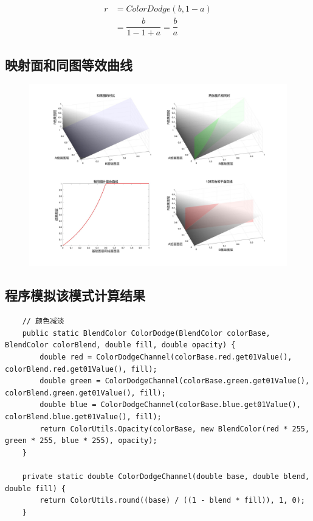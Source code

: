 \begin{equation}\begin{aligned}
	r&=ColorDodge(b,1-a)\\&= \dfrac{b}{1-1+a}=\dfrac{b}{a}
\end{aligned}\end{equation}

\subsection{ 映射面和同图等效曲线}
\begin{figure}[h!]
	\centering
	\includegraphics[width=\linewidth]{figure/颜色减淡.jpg}
	\caption{}
	\label{fig:}
\end{figure}

\newpage
\subsection{ 程序模拟该模式计算结果}

\begin{lstlisting}
	// 颜色减淡
	public static BlendColor ColorDodge(BlendColor colorBase, BlendColor colorBlend, double fill, double opacity) {
		double red = ColorDodgeChannel(colorBase.red.get01Value(), colorBlend.red.get01Value(), fill);
		double green = ColorDodgeChannel(colorBase.green.get01Value(), colorBlend.green.get01Value(), fill);
		double blue = ColorDodgeChannel(colorBase.blue.get01Value(), colorBlend.blue.get01Value(), fill);
		return ColorUtils.Opacity(colorBase, new BlendColor(red * 255, green * 255, blue * 255), opacity);
	}
	
	private static double ColorDodgeChannel(double base, double blend, double fill) {
		return ColorUtils.round((base) / ((1 - blend * fill)), 1, 0);
	}
	
\end{lstlisting}


